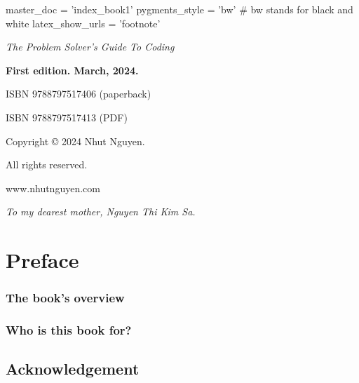 master_doc = 'index_book1'
pygments_style = 'bw' # bw stands for black and white
latex_show_urls = 'footnote'


\usepackage[paperwidth=7.5in,paperheight=9.25in]{geometry}

\date{March, 2024}
% 
\frontmatter


\textit{The Problem Solver's Guide To Coding} 

\textbf{First edition. March, 2024.} 

ISBN 9788797517406 (paperback)

ISBN 9788797517413 (PDF)


Copyright © 2024 Nhut Nguyen.

All rights reserved.

www.nhutnguyen.com

\newpage
\begin{center}
    \textit{To my dearest mother, Nguyen Thi Kim Sa.}
\end{center}

\sphinxstepscope



\chapter*{Preface}

\subsection*{The book’s overview}

\subsection*{Who is this book for?}

\section*{Acknowledgement}

\newpage





